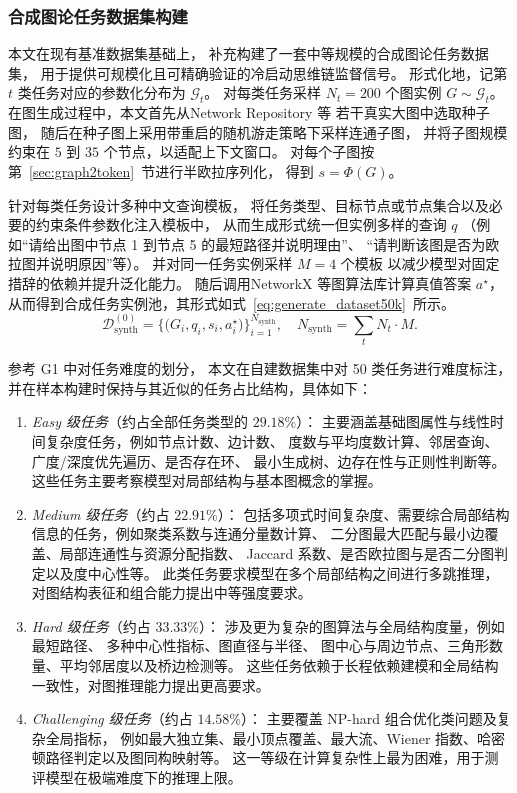 \subsubsection{合成图论任务数据集构建}
\label{subsubsec:synth_tasks}

本文在现有基准数据集基础上，
补充构建了一套中等规模的合成图论任务数据集，
用于提供可规模化且可精确验证的冷启动思维链监督信号。
形式化地，记第 $t$ 类任务对应的参数化分布为 $\mathcal{G}_t$。
对每类任务采样 $N_t=200$ 个图实例 $G\sim\mathcal{G}_t$。
在图生成过程中，本文首先从Network Repository\cite{Rossi2015TheND} 等
若干真实大图中选取种子图，
随后在种子图上采用带重启的随机游走策略下采样连通子图，
并将子图规模约束在 $5$ 到 $35$ 个节点，以适配上下文窗口。
对每个子图按第~\ref{sec:graph2token}\ 节进行半欧拉序列化，
得到 $s=\Phi(G)$。

针对每类任务设计多种中文查询模板，
将任务类型、目标节点或节点集合以及必要的约束条件参数化注入模板中，
从而生成形式统一但实例多样的查询 \(q\)
（例如“请给出图中节点 1 到节点 5 的最短路径并说明理由”、
“请判断该图是否为欧拉图并说明原因”等）。
并对同一任务实例采样 $M=4$ 个模板
以减少模型对固定措辞的依赖并提升泛化能力。
随后调用NetworkX\cite{Rossi2015TheND}  等图算法库计算真值答案 $a^\star$，
从而得到合成任务实例池，其形式如式~\ref{eq:generate_dataset50k}\ 所示。
\begin{equation}
\mathcal{D}_{\text{synth}}^{(0)}
=
\Big\{
\big(G_i,q_i,s_i,a_i^\star\big)
\Big\}_{i=1}^{N_{\text{synth}}},
\quad
N_{\text{synth}}=\sum_{t} N_t\cdot M.
\label{eq:generate_dataset50k}
\end{equation}


参考 G1 \cite{Guo2025G1TL}中对任务难度的划分，
本文在自建数据集中对 50 类任务进行难度标注，
并在样本构建时保持与其近似的任务占比结构，具体如下：
\begin{enumerate}
  \item \textit{Easy 级任务}（约占全部任务类型的 $29.18\%$）：
  主要涵盖基础图属性与线性时间复杂度任务，例如节点计数、边计数、
  度数与平均度数计算、邻居查询、广度/深度优先遍历、是否存在环、
  最小生成树、边存在性与正则性判断等。
  这些任务主要考察模型对局部结构与基本图概念的掌握。

  \item \textit{Medium 级任务}（约占 $22.91\%$）：
  包括多项式时间复杂度、需要综合局部结构信息的任务，例如聚类系数与连通分量数计算、
  二分图最大匹配与最小边覆盖、局部连通性与资源分配指数、
  Jaccard 系数、是否欧拉图与是否二分图判定以及度中心性等。
  此类任务要求模型在多个局部结构之间进行多跳推理，
  对图结构表征和组合能力提出中等强度要求。

  \item \textit{Hard 级任务}（约占 $33.33\%$）：
  涉及更为复杂的图算法与全局结构度量，例如最短路径、
  多种中心性指标、图直径与半径、
  图中心与周边节点、三角形数量、平均邻居度以及桥边检测等。
  这些任务依赖于长程依赖建模和全局结构一致性，对图推理能力提出更高要求。

  \item \textit{Challenging 级任务}（约占 $14.58\%$）：
  主要覆盖 NP-hard 组合优化类问题及复杂全局指标，
  例如最大独立集、最小顶点覆盖、最大流、Wiener 指数、哈密顿路径判定以及图同构映射等。
  这一等级在计算复杂性上最为困难，用于测评模型在极端难度下的推理上限。
\end{enumerate}

